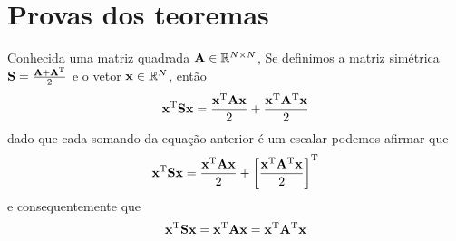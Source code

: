 \section{Provas dos teoremas}

\begin{myproofT}\label{proof:theo:simetricmatrix0}
Conhecida uma matriz quadrada $\MATRIX{A} \in \mathbb{R}^{N \times N}$,
Se definimos a matriz simétrica $\MATRIX{S}=\frac{\MATRIX{A}+\MATRIX{A}^{\transpose}}{2}$ e
o vetor $\VECTOR{x} \in \mathbb{R}^{N}$, então
\begin{equation}
\VECTOR{x}^{\transpose}\MATRIX{S}\VECTOR{x} = 
\frac{\VECTOR{x}^{\transpose}\MATRIX{A}\VECTOR{x}}{2} +
\frac{\VECTOR{x}^{\transpose}\MATRIX{A}^{\transpose}\VECTOR{x}}{2}
\end{equation}
dado que cada somando da equação anterior é um escalar podemos afirmar que 
\begin{equation}
\VECTOR{x}^{\transpose}\MATRIX{S}\VECTOR{x} = 
\frac{\VECTOR{x}^{\transpose}\MATRIX{A}\VECTOR{x}}{2} +
\left[\frac{\VECTOR{x}^{\transpose}\MATRIX{A}^{\transpose}\VECTOR{x}}{2}\right]^{\transpose}
\end{equation}
e consequentemente que
\begin{equation}
\VECTOR{x}^{\transpose}\MATRIX{S}\VECTOR{x} = 
\VECTOR{x}^{\transpose}\MATRIX{A}\VECTOR{x} =
\VECTOR{x}^{\transpose}\MATRIX{A}^{\transpose}\VECTOR{x}
\end{equation} 
\end{myproofT}

